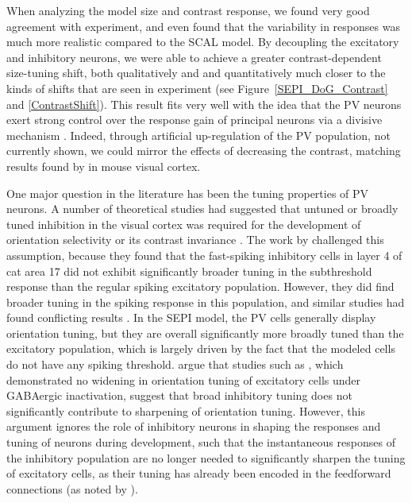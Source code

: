 When analyzing the model size and contrast response, we found very
good agreement with experiment, and even found that the variability in
responses was much more realistic compared to the SCAL model. By
decoupling the excitatory and inhibitory neurons, we were able to
achieve a greater contrast-dependent size-tuning shift, both
qualitatively and and quantitatively much closer to the kinds of
shifts that are seen in experiment (see Figure~\ref{SEPI_DoG_Contrast}
and \ref{ContrastShift}). This result fits very well with the idea
that the PV neurons exert strong control over the response gain of
principal neurons via a divisive mechanism \citep{Wilson2012}. Indeed,
through artificial up-regulation of the PV population, not currently
shown, we could mirror the effects of decreasing the contrast,
matching results found by \cite{Nienborg2013} in mouse visual cortex.

One major question in the literature has been the tuning properties of
PV neurons. A number of theoretical studies had suggested that untuned
or broadly tuned inhibition in the visual cortex was required for the
development of orientation selectivity or its contrast invariance
\citep{Somers1995, Troyer1998}. The work by \cite{Cardin2007}
challenged this assumption, because they found that the fast-spiking
inhibitory cells in layer 4 of cat area 17 did not exhibit
significantly broader tuning in the subthreshold response than the
regular spiking excitatory population. However, they did find broader
tuning in the spiking response in this population, and similar studies
had found conflicting results \citep{Hirsch2003, Nowak2008}. In the
SEPI model, the PV cells generally display orientation tuning, but
they are overall significantly more broadly tuned than the excitatory
population, which is largely driven by the fact that the modeled cells
do not have any spiking threshold. \cite{Cardin2007} argue that
studies such as \cite{Nelson1994}, which demonstrated no widening in
orientation tuning of excitatory cells under GABAergic inactivation,
suggest that broad inhibitory tuning does not significantly contribute
to sharpening of orientation tuning. However, this argument ignores
the role of inhibitory neurons in shaping the responses and tuning of
neurons during development, such that the instantaneous responses of
the inhibitory population are no longer needed to significantly
sharpen the tuning of excitatory cells, as their tuning has already
been encoded in the feedforward connections (as noted by
\citealt{Miikkulainen2005}).

